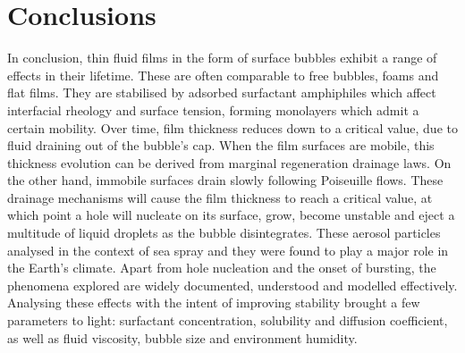 \documentclass[a4paper,12pt]{article}
\numberwithin{equation}{section}
\numberwithin{figure}{section}
\numberwithin{table}{section}
\begin{document}
\section{Conclusions}
In conclusion, thin fluid films in the form of surface bubbles exhibit a range of effects in their lifetime. These are often comparable to free bubbles, foams and flat films. They are stabilised by adsorbed surfactant amphiphiles which affect interfacial rheology and surface tension, forming monolayers which admit a certain mobility. Over time, film thickness reduces down to a critical value, due to fluid draining out of the bubble's cap. When the film surfaces are mobile, this thickness evolution can be derived from marginal regeneration drainage laws. On the other hand, immobile surfaces drain slowly following Poiseuille flows. These drainage mechanisms will cause the film thickness to reach a critical value, at which point a hole will nucleate on its surface, grow, become unstable and eject a multitude of liquid droplets as the bubble disintegrates. These aerosol particles analysed in the context of sea spray and they were found to play a major role in the Earth's climate. Apart from hole nucleation and the onset of bursting, the phenomena explored are widely documented, understood and modelled effectively. Analysing these effects with the intent of improving stability brought a few parameters to light: surfactant concentration, solubility and diffusion coefficient, as well as fluid viscosity, bubble size and environment humidity.



\newpage
\singlespacing





\end{document}
